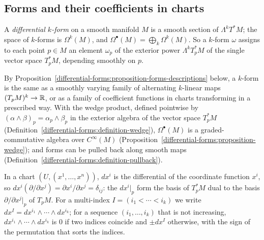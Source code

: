 \subsection{Forms and their coefficients in charts}\label{differential-forms:subsection-forms-charts}

\begin{definition}\label{differential-forms:definition-forms}
A \emph{differential $k$-form} on a smooth manifold $M$ is a smooth section of $\Lambda^kT^*M$; the space of $k$-forms is $\Omega^k(M)$, and $\Omega^\bullet(M) = \bigoplus_k\Omega^k(M)$.
So a $k$-form $\omega$ assigns to each point $p \in M$ an element $\omega_p$ of the exterior power $\Lambda^kT_p^*M$ of the single vector space $T_p^*M$, depending smoothly on $p$.
\end{definition}

By Proposition~\ref{differential-forms:proposition-forms-descriptions} below, a $k$-form is the same as a smoothly varying family of alternating $k$-linear maps
$(T_pM)^k \to \mathbb{R}$, or as a family of coefficient functions in charts transforming in a prescribed way. With the wedge product, defined pointwise by $(\alpha \wedge \beta)_p = \alpha_p \wedge \beta_p$ in the exterior algebra of
the vector space $T_p^*M$ (Definition~\ref{differential-forms:definition-wedge}), $\Omega^\bullet(M)$ is a graded-commutative algebra over $C^\infty(M)$ (Proposition~\ref{differential-forms:proposition-wedge}); and forms can be pulled
back along smooth maps (Definition~\ref{differential-forms:definition-pullback}).

In a chart $(U, (x^1, \ldots, x^n))$, $dx^i$ is the differential of the coordinate function $x^i$, so $dx^i(\partial/\partial x^j) = \partial x^i/\partial x^j = \delta_{ij}$: the
$dx^i|_p$ form the basis of $T_p^*M$ dual to the basis $\partial/\partial x^j|_p$ of $T_pM$. For a multi-index $I = (i_1 < \cdots < i_k)$ we write
$dx^I = dx^{i_1} \wedge \cdots \wedge dx^{i_k}$; for a sequence $(i_1, \ldots, i_k)$ that is not increasing, $dx^{i_1} \wedge \cdots \wedge dx^{i_k}$ is $0$ if two indices coincide
and $\pm dx^I$ otherwise, with the sign of the permutation that sorts the indices.

